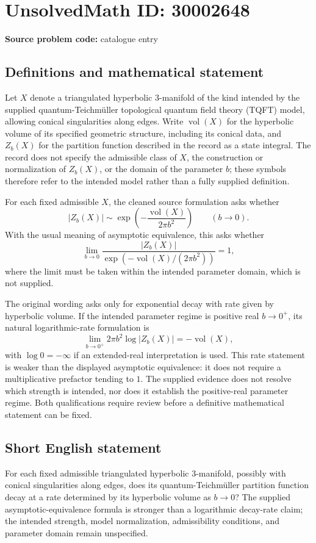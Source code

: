 \documentclass[11pt]{article}
\begin{document}
\section*{UnsolvedMath ID: 30002648}
\textbf{Source problem code:} catalogue entry
\subsection{Definitions and mathematical statement}
Let \(X\) denote a triangulated hyperbolic \(3\)-manifold of the kind intended by the supplied quantum-Teichmüller topological quantum field theory (TQFT) model, allowing conical singularities along edges. Write \(\operatorname{vol}(X)\) for the hyperbolic volume of its specified geometric structure, including its conical data, and \(Z_b(X)\) for the partition function described in the record as a state integral. The record does not specify the admissible class of \(X\), the construction or normalization of \(Z_b(X)\), or the domain of the parameter \(b\); these symbols therefore refer to the intended model rather than a fully supplied definition.

For each fixed admissible \(X\), the cleaned source formulation asks whether
\[
\lvert Z_b(X)\rvert\sim
\exp\!\left(-\frac{\operatorname{vol}(X)}{2\pi b^2}\right)
\qquad (b\to0).
\]
With the usual meaning of asymptotic equivalence, this asks whether
\[
\lim_{b\to0}
\frac{\lvert Z_b(X)\rvert}
{\exp\!\left(-\operatorname{vol}(X)/(2\pi b^2)\right)}=1,
\]
where the limit must be taken within the intended parameter domain, which is not supplied.

The original wording asks only for exponential decay with rate given by hyperbolic volume. If the intended parameter regime is positive real \(b\to0^+\), its natural logarithmic-rate formulation is
\[
\lim_{b\to0^+}2\pi b^2\log\lvert Z_b(X)\rvert
=-\operatorname{vol}(X),
\]
with \(\log 0=-\infty\) if an extended-real interpretation is used. This rate statement is weaker than the displayed asymptotic equivalence: it does not require a multiplicative prefactor tending to \(1\). The supplied evidence does not resolve which strength is intended, nor does it establish the positive-real parameter regime. Both qualifications require review before a definitive mathematical statement can be fixed.
\subsection{Short English statement}
For each fixed admissible triangulated hyperbolic \(3\)-manifold, possibly with conical singularities along edges, does its quantum-Teichmüller partition function decay at a rate determined by its hyperbolic volume as \(b\to0\)? The supplied asymptotic-equivalence formula is stronger than a logarithmic decay-rate claim; the intended strength, model normalization, admissibility conditions, and parameter domain remain unspecified.
\end{document}
